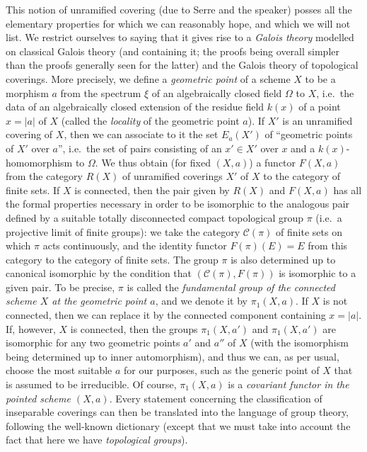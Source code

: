 \documentclass{article}
\newcommand{\oldpage}[1]{\marginpar{\footnotesize$\Big\vert$ \textit{p.~#1}}}
\theoremstyle{definition}
\theoremstyle{definition}
\theoremstyle{definition}
\theoremstyle{definition}
\theoremstyle{remark}
\begin{document}
This notion of unramified covering (due to Serre and the speaker) posses all the elementary properties for which we can reasonably hope, and which we will not list.
We restrict ourselves to saying that it gives rise to a \emph{Galois theory} modelled on classical Galois theory (and containing it; the proofs being overall simpler than the proofs generally seen for the latter) and the Galois theory of topological coverings.
More precisely, we define a \emph{geometric point} of a scheme \(X\) to be a morphism \(a\) from the spectrum \(\xi\) of an algebraically closed field \(\Omega\) to \(X\), i.e.~the data of an algebraically closed extension of the residue field \(k(x)\) of a point \(x=|a|\) of \(X\) (called the \emph{locality} of the geometric point \(a\)).
If \(X'\) is an unramified covering of \(X\), then we can associate to it the set \(E_a(X')\) of ``geometric points of \(X'\) over \(a\)'', i.e.~the set of pairs consisting of an \(x'\in X'\) over \(x\) and a \(k(x)\)-homomorphism to \(\Omega\).
We thus obtain (for fixed \((X,a)\)) a functor \(F(X,a)\) from the category \(R(X)\) of unramified coverings \(X'\) of \(X\) to the category of finite sets.
If \(X\) is connected, then the pair given by \(R(X)\) and \(F(X,a)\) has all the formal properties necessary in order to be isomorphic to the analogous pair defined by a suitable totally disconnected compact topological group \(\pi\) (i.e.~a projective limit of finite groups): we take the category \({\mathcal{C}}(\pi)\) of finite sets on which \(\pi\) acts continuously, and the identity functor \(F(\pi)(E)=E\) from this category to the category of finite sets.
The group \(\pi\) is also determined up to canonical isomorphic by the condition that \(({\mathcal{C}}(\pi),F(\pi))\) is isomorphic to a given pair.
To be precise, \(\pi\) is called the \emph{fundamental group of the connected scheme \(X\) at the geometric point \(a\)}, and we denote it by \(\pi_1(X,a)\).
If \(X\) is not connected, then we can replace it by the connected component containing \(x=|a|\).
If, however, \(X\) is connected, then the groups \(\pi_1(X,a')\) and \(\pi_1(X,a')\) are isomorphic for any two geometric points \(a'\) and \(a''\) of \(X\) (with the isomorphism being determined up to inner automorphism), and thus we can, as per usual, choose the most suitable \(a\) for our purposes, such as the generic point of \(X\) that is assumed to be irreducible.
\oldpage{182-19}Of course, \(\pi_1(X,a)\) is a \emph{covariant functor in the pointed scheme \((X,a)\)}.
Every statement concerning the classification of inseparable coverings can then be translated into the language of group theory, following the well-known dictionary (except that we must take into account the fact that here we have \emph{topological groups}).
\end{document}
